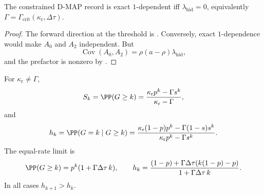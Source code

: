 \begin{lemma}\label{lem:one-dep-criterion-main}
The constrained D-MAP record is exact \(1\)-dependent iff
\(\lambda_{\mathrm{hid}}=0\), equivalently
\(\Gamma=\Gamma_{\mathrm{crit}}(\kappa_{\mathrm r},\Delta\tau)\).
\end{lemma}

\begin{proof}
The forward direction at the threshold is
.  Conversely, exact \(1\)-dependence
would make \(A_0\) and \(A_2\) independent.  But
\[
\operatorname{Cov}(A_0,A_2)=\rho(a-\rho)\lambda_{\mathrm{hid}},
\]
and the prefactor is nonzero by .
\end{proof}

\begin{lemma}\label{lem:survival-hazard-main}
For \(\kappa_{\mathrm r}\ne\Gamma\),
\begin{equation}\label{eq:survival-tail-main}
S_k=\PP(G\ge k)=
\frac{\kappa_{\mathrm r}p^k-\Gamma s^k}{\kappa_{\mathrm r}-\Gamma},
\end{equation}
and
\begin{equation}\label{eq:hazard-main}
h_k=\PP(G=k\mid G\ge k)=
\frac{\kappa_{\mathrm r}(1-p)p^k-\Gamma(1-s)s^k}
     {\kappa_{\mathrm r}p^k-\Gamma s^k}.
\end{equation}
The equal-rate limit is
\begin{equation}\label{eq:equal-rate-survival-hazard-main}
\PP(G\ge k)=p^k(1+\Gamma\Delta\tau\,k),
\qquad
h_k=
\frac{(1-p)+\Gamma\Delta\tau(k(1-p)-p)}
     {1+\Gamma\Delta\tau\,k}.
\end{equation}
In all cases \(h_{k+1}>h_k\).
\end{lemma}

